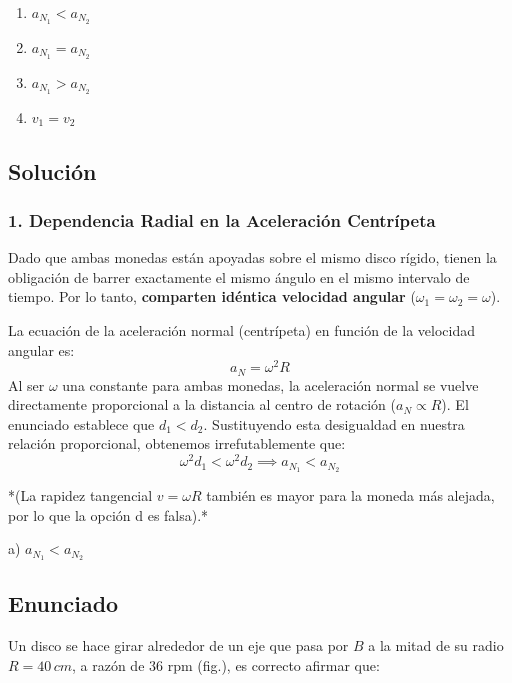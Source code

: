 \documentclass[12pt, a4paper]{article}
\begin{document}
\begin{enumerate}[label=\alph*)]
    \item $a_{N_1} < a_{N_2}$
    \item $a_{N_1} = a_{N_2}$
    \item $a_{N_1} > a_{N_2}$
    \item $v_1 = v_2$
\end{enumerate}

\subsection*{Solución}

\subsubsection*{1. Dependencia Radial en la Aceleración Centrípeta}
Dado que ambas monedas están apoyadas sobre el mismo disco rígido, tienen la obligación de barrer exactamente el mismo ángulo en el mismo intervalo de tiempo. Por lo tanto, \textbf{comparten idéntica velocidad angular} ($\omega_1 = \omega_2 = \omega$).

La ecuación de la aceleración normal (centrípeta) en función de la velocidad angular es:
$$ a_N = \omega^2 R $$
Al ser $\omega$ una constante para ambas monedas, la aceleración normal se vuelve directamente proporcional a la distancia al centro de rotación ($a_N \propto R$).
El enunciado establece que $d_1 < d_2$.
Sustituyendo esta desigualdad en nuestra relación proporcional, obtenemos irrefutablemente que:
$$ \omega^2 d_1 < \omega^2 d_2 \implies a_{N_1} < a_{N_2} $$

*(La rapidez tangencial $v = \omega R$ también es mayor para la moneda más alejada, por lo que la opción d es falsa).*

\begin{tcolorbox}[colback=green!5!white, colframe=green!50!black, title=Respuesta Final]
\centering \Large a) $a_{N_1} < a_{N_2}$
\end{tcolorbox}

\newpage

\subsection*{Enunciado}
Un disco se hace girar alrededor de un eje que pasa por $B$ a la mitad de su radio $R = 40\,\si{cm}$, a razón de $36\text{ rpm}$ (fig.), es correcto afirmar que:

\begin{center}
\end{center}
\end{document}
